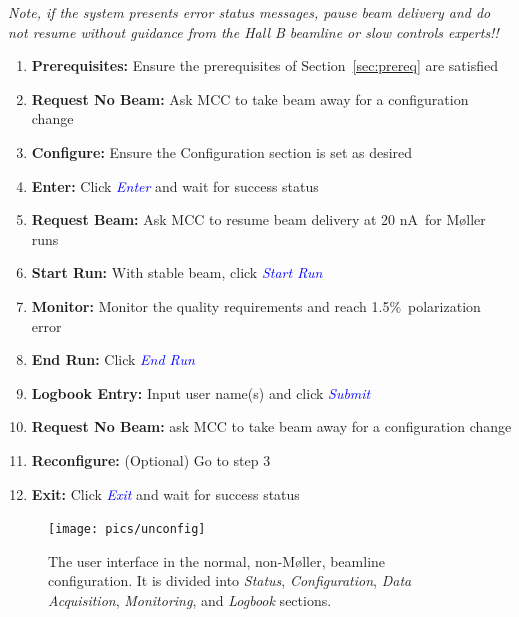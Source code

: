 \documentclass[amsmath,amssymb,notitlepage,12pt]{revtex4}
\newcommand{\ibeam}{20 nA\ }
\newcommand{\easy}{1.5\%}
\begin{document}
{\em Note, if the system presents error status messages, pause beam delivery and do not resume without guidance from the Hall B beamline or slow controls experts!!}
\begin{enumerate}
    \vspace{-4mm}\item {\bf Prerequisites:}  Ensure the prerequisites of Section~\ref{sec:prereq} are satisfied
    \vspace{-4mm}\item {\bf Request No Beam:}  Ask MCC to take beam away for a configuration change
    \vspace{-4mm}\item {\bf Configure:}  Ensure the Configuration section is set as desired
    \vspace{-4mm}\item {\bf Enter:} Click \textcolor{blue}{\em Enter} and wait for success status
    \vspace{-4mm}\item {\bf Request Beam:} Ask MCC to resume beam delivery at \ibeam for M{\o}ller runs
    \vspace{-4mm}\item {\bf Start Run:} With stable beam, click \textcolor{blue}{\em Start Run}
    \vspace{-4mm}\item {\bf Monitor:} Monitor the quality requirements and reach \easy\ polarization error
    \vspace{-4mm}\item {\bf End Run:} Click \textcolor{blue}{\em End Run}
    \vspace{-4mm}\item {\bf Logbook Entry:} Input user name(s) and click \textcolor{blue}{\em Submit}
    \vspace{-4mm}\item {\bf Request No Beam:} ask MCC to take beam away for a configuration change
    \vspace{-4mm}\item {\bf Reconfigure:} (Optional) Go to step 3
    \vspace{-4mm}\item {\bf Exit:} Click \textcolor{blue}{\em Exit} and wait for success status
\end{enumerate}

\begin{figure}[htbp]\centering
    \texttt{[image: pics/unconfig]}
    \caption{\label{fig:beamline}The user interface in the normal, non-M{\o}ller, beamline configuration.  It is divided into {\em Status}, {\em Configuration}, {\em Data Acquisition}, {\em Monitoring}, and {\em Logbook} sections.\label{fig:unconfig}}
\end{figure}
\end{document}
